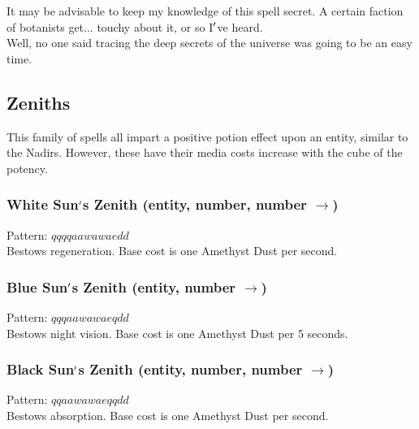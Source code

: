 \documentclass[12pt]{article}
\begin{document}
  
    It may be advisable to keep my knowledge of this spell secret. A certain faction of botanists get... touchy about it, or so I$\rq$ve heard.\\Well, no one said tracing the deep secrets of the universe was going to be an easy time.\\

\newpage

\label{sec:patterns/great_spells/zeniths}
\subsection*{Zeniths}


  
    This family of spells all impart a positive potion effect upon an entity, similar to the Nadirs. However, these have their media costs increase with the cube of the potency.\\


  \label{sec: patterns/great_spells/zeniths@hexcasting:potion/regeneration}
\subsubsection*{White Sun$\rq$s Zenith (entity, number, number $\rightarrow$)}

    Pattern: $qqqqaawawaedd$\\
      Bestows regeneration. Base cost is one Amethyst Dust per second.\\


  \label{sec: patterns/great_spells/zeniths@hexcasting:potion/night_vision}
\subsubsection*{Blue Sun$\rq$s Zenith (entity, number $\rightarrow$)}

    Pattern: $qqqaawawaeqdd$\\
      Bestows night vision. Base cost is one Amethyst Dust per 5 seconds.\\


  \label{sec: patterns/great_spells/zeniths@hexcasting:potion/absorption}
\subsubsection*{Black Sun$\rq$s Zenith (entity, number, number $\rightarrow$)}

    Pattern: $qqaawawaeqqdd$\\
      Bestows absorption. Base cost is one Amethyst Dust per second.\\
\end{document}
